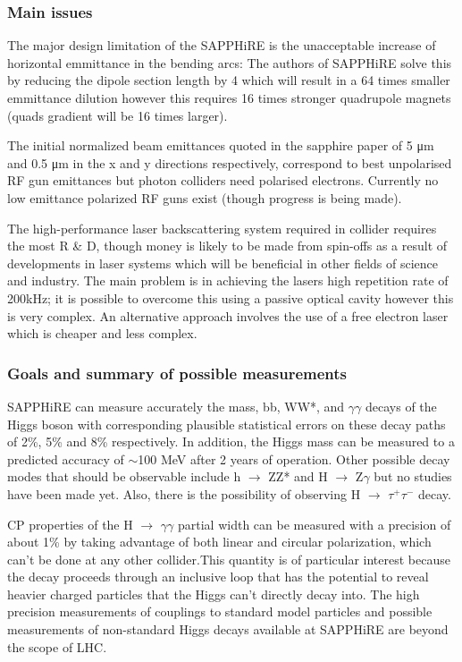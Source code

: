 \subsubsection{Main issues}
The major design limitation of the SAPPHiRE is the unacceptable increase of horizontal emmittance in the bending arcs: The authors of SAPPHiRE solve this by reducing the dipole section length by 4 which will result in a 64 times smaller emmittance dilution however this requires 16 times stronger quadrupole magnets (quads gradient will be 16 times larger)\cite{Telnov:Photons}.

The initial normalized beam emittances quoted in the sapphire paper of 5 μm and 0.5 μm in the x and y directions respectively, correspond to best unpolarised RF gun emittances but photon colliders need polarised electrons. Currently no low emittance polarized RF guns exist (though progress is being made)\cite{Telnov:Photons:MIT}.

The high-performance laser backscattering system required in collider requires the most R \& D, though money is likely to be made from spin-offs as a result of developments in laser systems which will be beneficial in other fields of science and industry. The main problem is in achieving the lasers high repetition rate of 200kHz; it is possible to overcome this using a passive optical cavity however this is very complex. An alternative approach involves the use of a free electron laser which is cheaper and less complex\cite{Zimmermann:TLEP}.

\subsubsection{Goals and summary of possible measurements}
SAPPHiRE can measure accurately the mass, bb, WW*, and $\gamma\gamma$ decays of the Higgs boson with corresponding plausible statistical errors on these decay paths of 2\%, 5\% and 8\% respectively. In addition, the Higgs mass can be measured to a predicted accuracy of $\sim$100 MeV after 2 years of operation. Other possible decay modes that should be observable include h $\rightarrow$ ZZ* and H $\rightarrow$ Z$\gamma$ but no studies have been made yet. Also, there is the possibility of observing H $\rightarrow$ $\tau^{+}\tau^{-}$ decay\cite{Bogacz:SAPPHiRE}.

CP properties of the H $\rightarrow$ $\gamma\gamma$ partial width can be measured with a precision of about 1\% by taking advantage of both linear and circular polarization, which can't be done at any other collider\cite{Chou:Higgs}.This quantity is of particular interest because the decay proceeds through an inclusive loop that has the potential to reveal heavier charged particles that the Higgs can't directly decay into. The high precision measurements of couplings to standard model particles and possible measurements of non-standard Higgs decays available at SAPPHiRE are beyond the scope of LHC.


